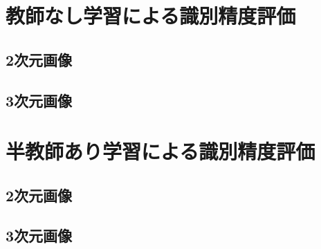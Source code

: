 \section{教師なし学習による識別精度評価}
\subsection{2次元画像}
\subsection{3次元画像}

\section{半教師あり学習による識別精度評価}
\subsection{2次元画像}
\subsection{3次元画像}

